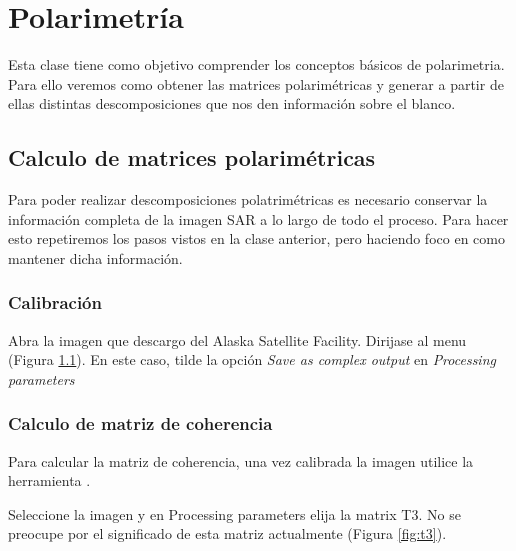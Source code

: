 \chapter{Polarimetría}

Esta clase tiene como objetivo comprender los conceptos básicos de polarimetria. Para ello veremos como obtener las matrices polarimétricas y generar a partir de ellas distintas descomposiciones que nos den información sobre el blanco.

\section{Calculo de matrices polarimétricas}

Para poder realizar descomposiciones polatrimétricas es necesario conservar la información completa de la imagen SAR a lo largo de todo el proceso. Para hacer esto repetiremos los pasos vistos en la clase anterior, pero haciendo foco en como mantener dicha información.

\subsection{Calibración}
Abra la imagen  que descargo del Alaska Satellite Facility.  Dirijase al menu  (Figura \ref{fig:calibrar}). En este caso, tilde la opción \emph{Save as complex output} en \emph{Processing parameters}

\begin{figure}[h!]
    \centering
    \hfill
    \caption{}
    \label{fig:calibrar}
\end{figure}

\subsection{Calculo de matriz de coherencia}

Para calcular la matriz de coherencia, una vez calibrada la imagen utilice la herramienta .

Seleccione la imagen  y en Processing parameters elija la matrix T3. No se preocupe por el significado de esta matriz actualmente (Figura \ref{fig:t3}).

